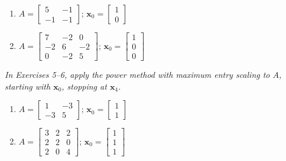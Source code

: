 \documentclass{article}
\begin{document}
\begin{enumerate}
  \item[3.] $A = \begin{bmatrix}5&-1\\-1&-1\end{bmatrix}$;\quad
        $\mathbf{x}_0 = \begin{bmatrix}1\\0\end{bmatrix}$

  \item[4.] $A = \begin{bmatrix}7&-2&0\\-2&6&-2\\0&-2&5\end{bmatrix}$;\quad
        $\mathbf{x}_0 = \begin{bmatrix}1\\0\\0\end{bmatrix}$

\end{enumerate}

\noindent\textit{In Exercises 5--6, apply the power method with maximum entry scaling to
$A$, starting with $\mathbf{x}_0$, stopping at $\mathbf{x}_4$.}

\begin{enumerate}
  \item[5.] $A = \begin{bmatrix}1&-3\\-3&5\end{bmatrix}$;\quad
        $\mathbf{x}_0 = \begin{bmatrix}1\\1\end{bmatrix}$

  \item[6.] $A = \begin{bmatrix}3&2&2\\2&2&0\\2&0&4\end{bmatrix}$;\quad
        $\mathbf{x}_0 = \begin{bmatrix}1\\1\\1\end{bmatrix}$

\end{enumerate}
\end{document}
